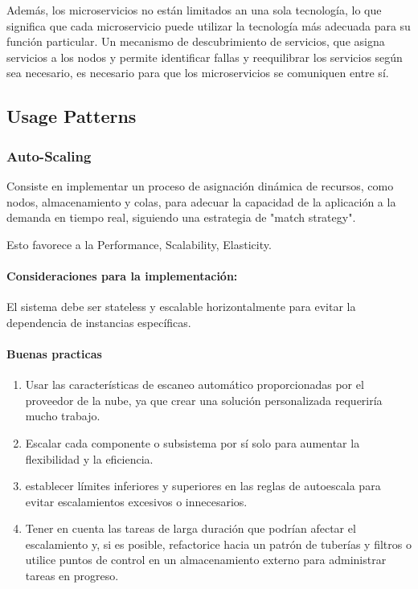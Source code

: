 \documentclass{article}
\begin{document}
		Además, los microservicios no están limitados an una sola tecnología, lo que significa que cada microservicio puede utilizar la tecnología más adecuada para su función particular. Un mecanismo de descubrimiento de servicios, que asigna servicios a los nodos y permite identificar fallas y reequilibrar los servicios según sea necesario, es necesario para que los microservicios se comuniquen entre sí.
		
		\subsection{Usage Patterns}
		\subsubsection{Auto-Scaling}\label{sec:auto_scaling}
		Consiste en implementar un proceso de asignación dinámica de recursos, como nodos, almacenamiento y colas, para adecuar la capacidad de la aplicación a la demanda en tiempo real, siguiendo una estrategia de "match strategy".
		
		Esto favorece a la Performance, Scalability, Elasticity.
		
		\paragraph{Consideraciones para la implementación:} 		
		El sistema debe ser stateless y escalable horizontalmente para evitar la dependencia de instancias específicas.
		
		\paragraph{Buenas practicas} 		
			\begin{enumerate}
				\item Usar las características de escaneo automático proporcionadas por el proveedor de la nube, ya que crear una solución personalizada requeriría mucho trabajo. 
				\item Escalar cada componente o subsistema por sí solo para aumentar la flexibilidad y la eficiencia.
				\item establecer límites inferiores y superiores en las reglas de autoescala para evitar escalamientos excesivos o innecesarios.
				\item Tener en cuenta las tareas de larga duración que podrían afectar el escalamiento y, si es posible, refactorice hacia un patrón de tuberías y filtros o utilice puntos de control en un almacenamiento externo para administrar tareas en progreso.
			\end{enumerate}
		
\end{document}
